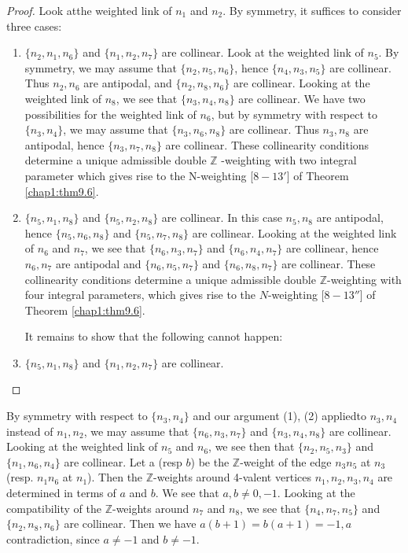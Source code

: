 \begin{proof}
Look at\pageoriginale the weighted link of $n_1$ and $n_2$. By
symmetry, it suffices to consider three cases:  
\begin{enumerate}
\item $\{ n_2, n_1, n_6 \}$ and $\{ n_1, n_2, n_7 \}$ are
  collinear. Look at the weighted link of $n_5$. By symmetry, we may
  assume that $\{ n_2, n_5, n_6 \}$, hence $\{ n_4, n_3, n_5 \}$ are
  collinear.  Thus $n_2 , n_6$ are antipodal, and $\{ n_2, n_8, n_6
  \}$ are collinear.  Looking at the weighted link of $n_8$, we see
  that $\{ n_3, n_4, n_8 \}$ are collinear. We have two possibilities
  for the weigh\-ted link of $n_6$, but by symmetry with respect to $\{
  n_3, n_4 \}$, we may assume that $\{ n_3, n_6, n_8 \}$ are
  collinear.  Thus $n_3 , n_8$ are antipodal, hence $\{ n_3, n_7, n_8
  \}$ are collinear.  These collinearity conditions determine a unique
  admissible double $\mathbb{Z}$ -weighting with two integral
  parameter which gives rise to the N-weighting [$8-13'$] of Theorem
\ref{chap1:thm9.6}.  

\item $\{ n_5, n_1, n_8 \}$ and $\{ n_5, n_2, n_8 \}$ are collinear.
  In this case $n_5, n_8$ are antipodal, hence $\{ n_5, n_6, n_8 \}$
  and $\{ n_5, n_7, n_8 \}$ are collinear.  Looking at the weighted
  link of $n_6$ and $n_7$, we see that $\{ n_6, n_3, n_7 \}$ and $\{
  n_6, n_4, n_7 \}$ are collinear, hence $n_6, n_7$ are antipodal and
  $\{ n_6, n_5, n_7 \}$ and $\{ n_6, n_8, n_7 \}$ are collinear.
  These collinearity conditions determine a unique admissible double
  $\mathbb{Z}$-weighting with four integral parameters, which gives
  rise to the $N$-weighting [$8-13''$] of Theorem \ref{chap1:thm9.6}. 

It remains to show that the following cannot happen:

\item $\{ n_5, n_1, n_8 \}$ and $\{ n_1, n_2, n_7 \}$ are collinear. 
\end{enumerate}  
\end{proof}

\noindent
By symmetry with respect to $\{ n_3, n_4 \}$ and our argument (1),
(2) applied\pageoriginale to $n_3, n_4$ instead of $n_1, n_2$, we may
assume that $\{n_6, 
n_3, n_7\}$ and $\{n_3, n_4, n_8\}$ are collinear. Looking at the
weighted link of $n_5$ and $n_6$, we see then that $\{n_2, n_5, n_3\}$
and $\{n_1, n_6, n_4\}$ are collinear. Let a (resp $b$) be the
$\mathbb{Z}$-weight of the edge $n_3n_5$ at $n_3$ (resp. $n_1n_6$ at
$n_1$). Then the $\mathbb{Z}$-weights around 4-valent vertices $n_1,
n_2, n_3, n_4$ are determined in terms of $a$ and $b$. We see that
$a, b\neq 0, -1$. Looking at the compatibility of the
$\mathbb{Z}$-weights around $n_7$ and $n_8$, we see that $\{n_4, n_7,
n_5\}$ and $\{n_2, n_8, n_6\}$ are collinear. Then we have $a(b+1)=
b(a+1)=-1 ,a $ contradiction, since $a\neq -1$ and $b\neq -1$. 

